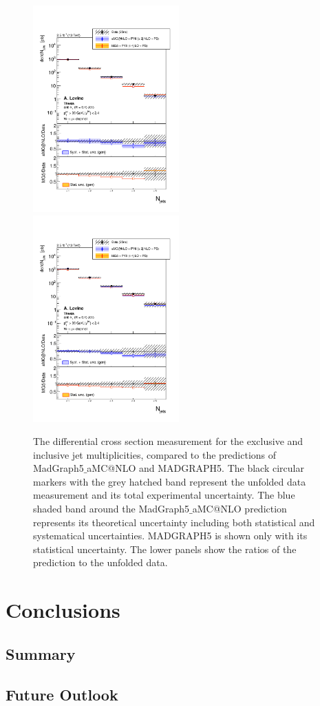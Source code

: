 \documentclass[oneside, letterpaper, oldfontcommands]{memoir}
\let\oldbib
\renewcommand*{}{\SingleSpace\oldbib}
\begin{document}
\begin{figure}[hp]
    \includegraphics[width=0.5\textwidth]{SMu_unfolded_ZNGoodJetsFull_Zexc_Bayes_JetPtMin_30_JetEtaMax_24_MGPYTHIA6_.pdf}
    \includegraphics[width=0.5\textwidth]{SMu_unfolded_ZNGoodJetsFull_Zinc_Bayes_JetPtMin_30_JetEtaMax_24_MGPYTHIA6_.pdf}
    \caption{The differential cross section measurement for the exclusive and inclusive jet multiplicities, compared to the predictions of {\sc MadGraph5$\_$aMC@NLO} and MADGRAPH5. The black circular markers with the grey hatched band represent the unfolded data measurement and its total experimental uncertainty. The blue shaded band around the {\sc MadGraph5$\_$aMC@NLO} prediction represents its theoretical uncertainty including both statistical and systematical uncertainties. MADGRAPH5 is shown only with its statistical uncertainty. The lower panels show the ratios of the prediction to the unfolded data.}
    \label{fig:xsec_Njets_nlo}
\end{figure}


\chapter{Conclusions}
\section{Summary}
\section{Future Outlook}





%
%


\end{document}

